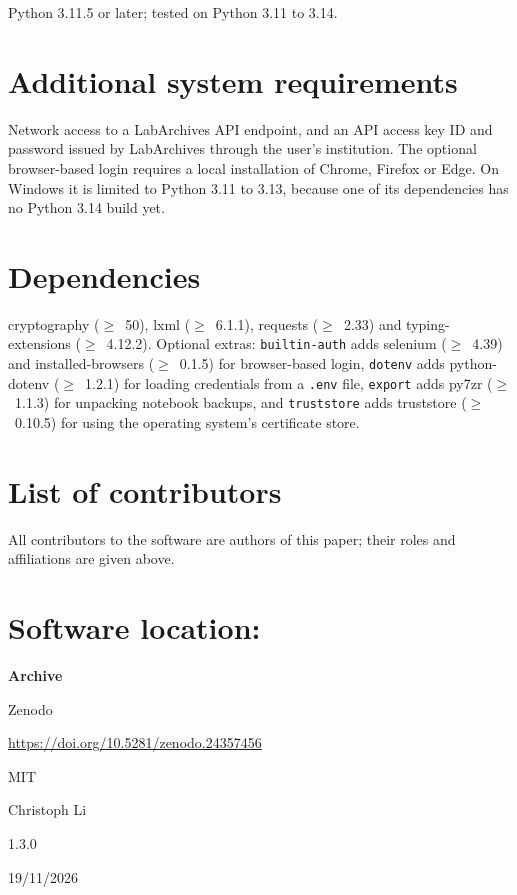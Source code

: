 \documentclass{jors}
\begin{document}
Python 3.11.5 or later; tested on Python 3.11 to 3.14.

\section*{Additional system requirements}

Network access to a LabArchives API endpoint, and an API access key ID and
password issued by LabArchives through the user's institution. The optional
browser-based login requires a local installation of Chrome, Firefox or
Edge. On Windows it is limited to Python 3.11 to 3.13, because one of its
dependencies has no Python 3.14 build yet.

\section*{Dependencies}

cryptography ($\geq$~50), lxml ($\geq$~6.1.1), requests ($\geq$~2.33) and
typing-extensions ($\geq$~4.12.2). Optional extras: \texttt{builtin-auth}
adds selenium ($\geq$~4.39) and installed-browsers ($\geq$~0.1.5) for
browser-based login, \texttt{dotenv} adds python-dotenv ($\geq$~1.2.1) for
loading credentials from a \texttt{.env} file, \texttt{export} adds
py7zr ($\geq$~1.1.3) for unpacking notebook backups, and
\texttt{truststore} adds truststore ($\geq$~0.10.5) for using the operating
system's certificate store.

\section*{List of contributors}

All contributors to the software are authors of this paper; their roles and
affiliations are given above.

\section*{Software location:}

{\bf Archive}

\begin{description}[noitemsep,topsep=0pt]
	\item[Name:] Zenodo
	\item[Persistent identifier:] \url{https://doi.org/10.5281/zenodo.24357456}
	\item[Licence:] MIT
	\item[Publisher:] Christoph Li
	\item[Version published:] 1.3.0
	\item[Date published:] 19/11/2026
\end{description}
\end{document}
